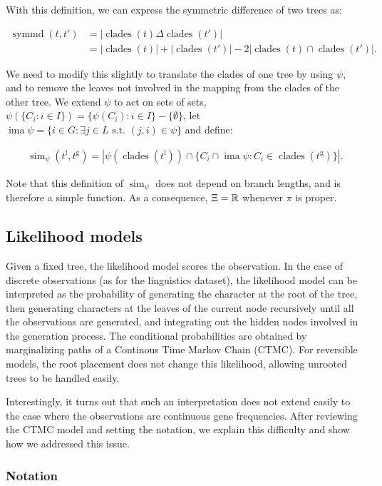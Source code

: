 \documentclass {article}
\DeclareMathOperator{\simi}{sim}
\DeclareMathOperator{\image}{ima}
\DeclareMathOperator{\clades}{clades}
\DeclareMathOperator{\symmd}{symmd}
\newcommand\lgmap{\psi}
\newcommand\gene{{\mathrm{g}}}
\newcommand\lang{{\mathrm{l}}}
\begin{document}
With this definition, we can express the symmetric difference of two trees as:

\begin{align*} 
\symmd(t,t') &= |\clades(t) \Delta \clades(t')|\\ &= |\clades(t)| + |\clades(t')| - 2|\clades(t) \cap \clades(t')|.
\end{align*}

We need to modify this slightly to translate the clades of one tree by using $\lgmap$, and to remove the leaves not involved in the mapping from the clades of the other tree.  We extend $\lgmap$ to act on sets of sets, $\lgmap(\{C_i:i\in I\}) = \{\lgmap(C_i):i\in I\}-\{\emptyset\}$, let $\image \lgmap = \{i \in G : \exists j\in L \textrm{ s.t. } (j,i)\in\lgmap\}$ and define:

\begin{align*} 
\simi_\lgmap(t^\lang,t^\gene) = |\lgmap(\clades(t^\lang))\cap \{C_i\cap \image \lgmap : C_i \in \clades(t^\gene)\}|.
\end{align*}

Note that this definition of $\simi_\lgmap$ does not depend on branch lengths, and is therefore a simple function.  As a consequence, $\Xi = {\mathbb R}$ whenever $\pi$ is proper.

\subsection{Likelihood models}

Given a fixed tree, the likelihood model scores the observation.  In the case of discrete observations (as for the linguistics dataset),  the likelihood model can be interpreted as the probability of generating the character at the root of the tree, then generating characters at the leaves of the current node recursively until all the observations are generated, and integrating out the hidden nodes involved in the generation process.  The conditional probabilities are obtained by marginalizing paths of a Continous Time Markov Chain (CTMC).  For reversible models, the root placement does not change this likelihood, allowing unrooted trees to be handled easily.

Interestingly, it turns out that such an interpretation does not extend easily to the case where the observations are continuous gene frequencies.
After reviewing the CTMC model and setting the notation, we explain this difficulty and show how we addressed this issue. 

\subsubsection*{Notation}
\end{document}
